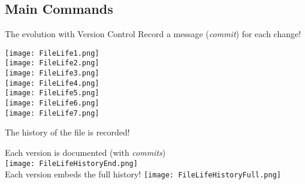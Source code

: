 \documentclass[xcolor=x11names,compress]{beamer}
\renewcommand{\(}{\begin{columns}}
\renewcommand{\)}{\end{columns}}
\newcommand{\<}[1]{\begin{column}{#1}}
\renewcommand{\>}{\end{column}}
\begin{document}
\subsection{Main Commands}

\begin{frame}{The evolution \textcolor{brique}{with Version Control}}
Record a message (\emph{commit})  for each change!
\begin{center}
\begin{itemize}
    {\texttt{[image: FileLife1.png]} \\ }
    {\texttt{[image: FileLife2.png]} \\ }
    {\texttt{[image: FileLife3.png]} \\ }
    {\texttt{[image: FileLife4.png]} \\ }
    {\texttt{[image: FileLife5.png]} \\ }
    {\texttt{[image: FileLife6.png]} \\ }
    {\texttt{[image: FileLife7.png]} \\ }
\end{itemize}
\end{center}
\end{frame}

\begin{frame}{The history of the file is recorded!}
\begin{center}
\begin{itemize}
    {Each version is documented (with \emph{commits}) \\ }
    {\texttt{[image: FileLifeHistoryEnd.png]} \\ }
    {Each version embeds the full history!  }
    {\texttt{[image: FileLifeHistoryFull.png]} \\ }
\end{itemize}
\end{center}
\end{frame}
\end{document}
